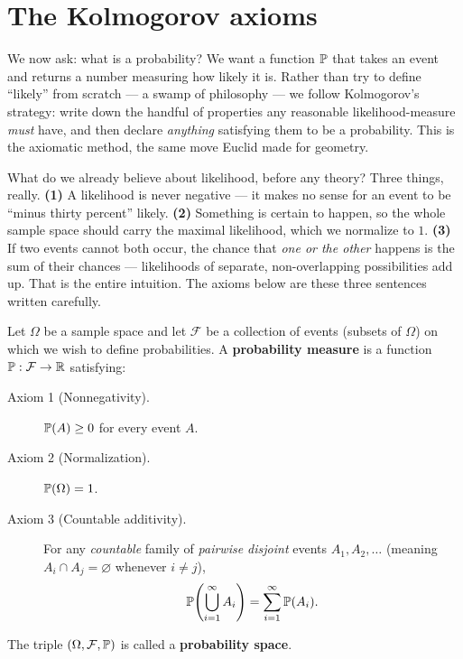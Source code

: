 \section{The Kolmogorov axioms}
\label{ch03:axioms}

We now ask: what is a probability?
We want a function $\P$ that takes an event and returns a number measuring how
likely it is. Rather than try to define ``likely'' from scratch --- a swamp of
philosophy --- we follow Kolmogorov's strategy: write down the handful of
properties any reasonable likelihood-measure \emph{must} have, and then declare
\emph{anything} satisfying them to be a probability. This is the axiomatic
method, the same move Euclid made for geometry.

\begin{intuitionbox}
What do we already believe about likelihood, before any theory? Three things,
really. \textbf{(1)} A likelihood is never negative --- it makes no sense for an
event to be ``minus thirty percent'' likely. \textbf{(2)} Something is certain to
happen, so the whole sample space should carry the maximal likelihood, which we
normalize to $1$. \textbf{(3)} If two events cannot both occur, the chance that
\emph{one or the other} happens is the sum of their chances --- likelihoods
of separate, non-overlapping possibilities add up. That is the entire intuition.
The axioms below are these three sentences written carefully.
\end{intuitionbox}

\begin{definition}
\label{ch03:def-axioms}
Let $\Omega$ be a sample space and let $\mathcal{F}$ be a collection of events
(subsets of $\Omega$) on which we wish to define probabilities. A
\textbf{probability measure} is a function $\P : \mathcal{F} \to \R$ satisfying:
\begin{description}
\item[Axiom 1 (Nonnegativity).] $\P(A) \ge 0$ for every event $A$.
\item[Axiom 2 (Normalization).] $\P(\Omega) = 1$.
\item[Axiom 3 (Countable additivity).] For any \emph{countable} family of
\emph{pairwise disjoint} events $A_1, A_2, \dots$ (meaning $A_i \cap A_j =
\varnothing$ whenever $i \ne j$),
\[
\P\!\left(\bigcup_{i=1}^{\infty} A_i\right) = \sum_{i=1}^{\infty} \P(A_i).
\]
\end{description}
The triple $(\Omega, \mathcal{F}, \P)$ is called a \textbf{probability space}.
\end{definition}

